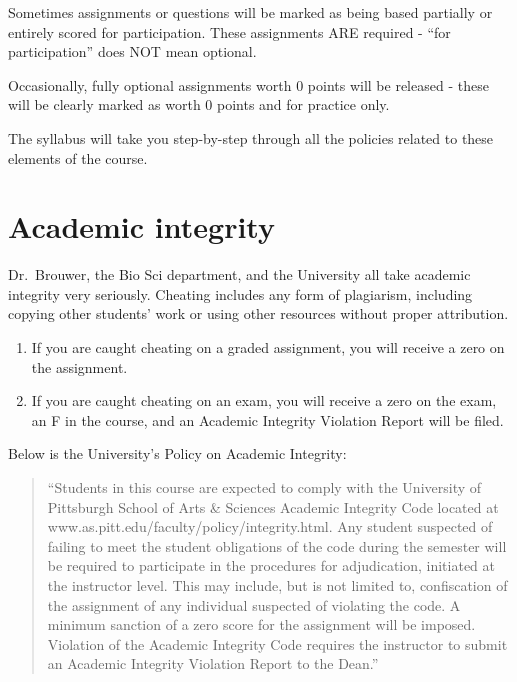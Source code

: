 \documentclass[
]{book}
\providecommand{\tightlist}{%
  \setlength{\itemsep}{0pt}\setlength{\parskip}{0pt}}
\begin{document}
Sometimes assignments or questions will be marked as being based partially or entirely scored for participation. These assignments ARE required - ``for participation'' does NOT mean optional.

Occasionally, fully optional assignments worth 0 points will be released - these will be clearly marked as worth 0 points and for practice only.

The syllabus will take you step-by-step through all the policies related to these elements of the course.

\hypertarget{academic-integrity}{%
\chapter{Academic integrity}\label{academic-integrity}}

Dr.~Brouwer, the Bio Sci department, and the University all take academic integrity very seriously. Cheating includes any form of plagiarism, including copying other students' work or using other resources without proper attribution.

\begin{enumerate}
\def\labelenumi{\arabic{enumi}.}
\tightlist
\item
  If you are caught cheating on a graded assignment, you will receive a zero on the assignment.
\item
  If you are caught cheating on an exam, you will receive a zero on the exam, an F in the course, and an Academic Integrity Violation Report will be filed.
\end{enumerate}

Below is the University's Policy on Academic Integrity:

\begin{quote}
``Students in this course are expected to comply with the University of Pittsburgh School of Arts \& Sciences Academic Integrity Code located at www.as.pitt.edu/faculty/policy/integrity.html. Any student suspected of failing to meet the student obligations of the code during the semester will be required to participate in the procedures for adjudication, initiated at the instructor level. This may include, but is not limited to, confiscation of the assignment of any individual suspected of violating the code. A minimum sanction of a zero score for the assignment will be imposed. Violation of the Academic Integrity Code requires the instructor to submit an Academic Integrity Violation Report to the Dean.''
\end{quote}
\end{document}
